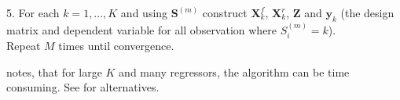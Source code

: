 \documentclass[11pt,a4paper]{article}
\begin{document}
\begin{center}
{\begin{minipage}{12cm}
5. For each $k=1,...,K$ and using $\mathbf{S}^{(m)}$ construct $\mathbf{X}_k^f$, $\mathbf{X}_k^r$, $\mathbf{Z}$ and $\mathbf{y}_k$ (the design matrix and dependent variable for all observation where $S_i^{(m)}=k$).  \\

Repeat $M$ times until convergence. 
\end{minipage} } \end{center}

\citet{FruehwirthSchnatter.2006} notes, that for large $K$ and many regressors, the algorithm can be time consuming. See \citet[p. 259]{FruehwirthSchnatter.2006} for alternatives. 



\end{document}
